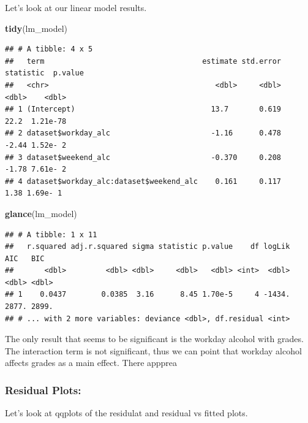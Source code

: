 \documentclass[]{article}
\newenvironment{Shaded}{\begin{snugshade}}{\end{snugshade}}
\newcommand{\KeywordTok}[1]{\textcolor[rgb]{0.13,0.29,0.53}{\textbf{#1}}}
\newcommand{\NormalTok}[1]{#1}
\begin{document}
Let's look at our linear model results.

\begin{Shaded}
\begin{Highlighting}[]
\KeywordTok{tidy}\NormalTok{(lm_model)}
\end{Highlighting}
\end{Shaded}

\begin{verbatim}
## # A tibble: 4 x 5
##   term                                    estimate std.error statistic  p.value
##   <chr>                                      <dbl>     <dbl>     <dbl>    <dbl>
## 1 (Intercept)                               13.7       0.619     22.2  1.21e-78
## 2 dataset$workday_alc                       -1.16      0.478     -2.44 1.52e- 2
## 3 dataset$weekend_alc                       -0.370     0.208     -1.78 7.61e- 2
## 4 dataset$workday_alc:dataset$weekend_alc    0.161     0.117      1.38 1.69e- 1
\end{verbatim}

\begin{Shaded}
\begin{Highlighting}[]
\KeywordTok{glance}\NormalTok{(lm_model)}
\end{Highlighting}
\end{Shaded}

\begin{verbatim}
## # A tibble: 1 x 11
##   r.squared adj.r.squared sigma statistic p.value    df logLik   AIC   BIC
##       <dbl>         <dbl> <dbl>     <dbl>   <dbl> <int>  <dbl> <dbl> <dbl>
## 1    0.0437        0.0385  3.16      8.45 1.70e-5     4 -1434. 2877. 2899.
## # ... with 2 more variables: deviance <dbl>, df.residual <int>
\end{verbatim}

The only result that seems to be significant is the workday alcohol with
grades. The interaction term is not significant, thus we can point that
workday alcohol affects grades as a main effect. There appprea

\hypertarget{residual-plots}{%
\subsubsection{Residual Plots:}\label{residual-plots}}

Let's look at qqplots of the residulat and residual vs fitted plots.
\end{document}
